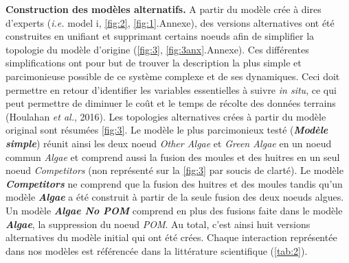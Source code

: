 \documentclass[12pt]{report}
\begin{document}
\textbf{Construction des modèles alternatifs.} A partir du modèle crée à dires d'experts (\textit{i.e.} model i, \autoref{fig:2}, \autoref{fig:1}.Annexe), des versions alternatives ont été construites en unifiant et supprimant certains noeuds afin de simplifier la topologie du modèle d'origine (\autoref{fig:3}, \autoref{fig:3anx}.Annexe). Ces différentes simplifications ont pour but de trouver la description la plus simple et parcimonieuse possible de ce système complexe et de ses dynamiques. Ceci doit permettre en retour d'identifier les variables essentielles à suivre \textit{in situ}, ce qui peut permettre de diminuer le coût et le temps de récolte des données terrains (Houlahan \textit{et al.}, 2016).
Les topologies alternatives crées à partir du modèle original sont résumées \autoref{fig:3}.
Le modèle le plus parcimonieux testé (\textbf{\textit{Modèle simple}}) réunit ainsi les deux noeud \textit{Other Algae} et \textit{Green Algae} en un noeud commun \textit{Algae} et comprend aussi la fusion des moules et des huitres en un seul noeud \textit{Competitors} (non représenté sur la \autoref{fig:3} par soucis de clarté). Le modèle \textbf{\textit{Competitors}} ne comprend que la fusion des huitres et des moules tandis qu'un modèle \textbf{\textit{Algae}} a été construit à partir de la seule fusion des deux noeuds algues. Un modèle \textbf{\textit{Algae No POM}} comprend en plus des fusions faite dans le modèle \textbf{\textit{Algae}}, la suppression du noeud \textit{POM}.
Au total, c'est ainsi huit versions alternatives du modèle initial qui ont été crées. Chaque interaction représentée dans nos modèles est référencée dans la littérature scientifique (\autoref{tab:2}).
\newline
\end{document}
